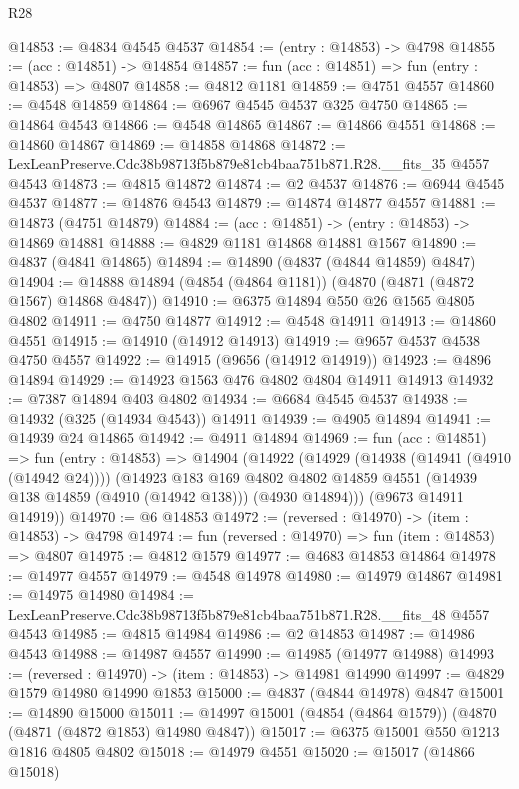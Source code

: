 \begin{lexlean}{R28}
\begin{coremodule}
@14853 := @4834 @4545 @4537
@14854 := (entry : @14853) -> @4798
@14855 := (acc : @14851) -> @14854
@14857 := fun (acc : @14851) => fun (entry : @14853) => @4807
@14858 := @4812 @1181
@14859 := @4751 @4557
@14860 := @4548 @14859
@14864 := @6967 @4545 @4537 @325 @4750
@14865 := @14864 @4543
@14866 := @4548 @14865
@14867 := @14866 @4551
@14868 := @14860 @14867
@14869 := @14858 @14868
@14872 := LexLeanPreserve.Cdc38b98713f5b879e81cb4baa751b871.R28.__fits_35 @4557 @4543
@14873 := @4815 @14872
@14874 := @2 @4537
@14876 := @6944 @4545 @4537
@14877 := @14876 @4543
@14879 := @14874 @14877 @4557
@14881 := @14873 (@4751 @14879)
@14884 := (acc : @14851) -> (entry : @14853) -> @14869 @14881
@14888 := @4829 @1181 @14868 @14881 @1567
@14890 := @4837 (@4841 @14865)
@14894 := @14890 (@4837 (@4844 @14859) @4847)
@14904 := @14888 @14894 (@4854 (@4864 @1181)) (@4870 (@4871 (@4872 @1567) @14868 @4847))
@14910 := @6375 @14894 @550 @26 @1565 @4805 @4802
@14911 := @4750 @14877
@14912 := @4548 @14911
@14913 := @14860 @4551
@14915 := @14910 (@14912 @14913)
@14919 := @9657 @4537 @4538 @4750 @4557
@14922 := @14915 (@9656 (@14912 @14919))
@14923 := @4896 @14894
@14929 := @14923 @1563 @476 @4802 @4804 @14911 @14913
@14932 := @7387 @14894 @403 @4802
@14934 := @6684 @4545 @4537
@14938 := @14932 (@325 (@14934 @4543)) @14911
@14939 := @4905 @14894
@14941 := @14939 @24 @14865
@14942 := @4911 @14894
@14969 := fun (acc : @14851) =>
  fun (entry : @14853) =>
  @14904
    (@14922
      (@14929
        (@14938 (@14941 (@4910 (@14942 @24))))
        (@14923
          @183
          @169
          @4802
          @4802
          @14859
          @4551
          (@14939 @138 @14859 (@4910 (@14942 @138)))
          (@4930 @14894)))
      (@9673 @14911 @14919))
@14970 := @6 @14853
@14972 := (reversed : @14970) -> (item : @14853) -> @4798
@14974 := fun (reversed : @14970) => fun (item : @14853) => @4807
@14975 := @4812 @1579
@14977 := @4683 @14853 @14864
@14978 := @14977 @4557
@14979 := @4548 @14978
@14980 := @14979 @14867
@14981 := @14975 @14980
@14984 := LexLeanPreserve.Cdc38b98713f5b879e81cb4baa751b871.R28.__fits_48 @4557 @4543
@14985 := @4815 @14984
@14986 := @2 @14853
@14987 := @14986 @4543
@14988 := @14987 @4557
@14990 := @14985 (@14977 @14988)
@14993 := (reversed : @14970) -> (item : @14853) -> @14981 @14990
@14997 := @4829 @1579 @14980 @14990 @1853
@15000 := @4837 (@4844 @14978) @4847
@15001 := @14890 @15000
@15011 := @14997 @15001 (@4854 (@4864 @1579)) (@4870 (@4871 (@4872 @1853) @14980 @4847))
@15017 := @6375 @15001 @550 @1213 @1816 @4805 @4802
@15018 := @14979 @4551
@15020 := @15017 (@14866 @15018)

\end{coremodule}
\end{lexlean}
